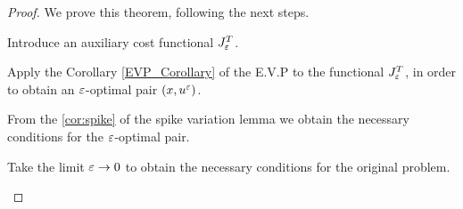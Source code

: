 \begin{proof}
    We prove this theorem, following the next steps.
    \begin{inparaenum} 
        \item
            Introduce an auxiliary cost functional $J_{\varepsilon}^{T}$.
        \item
            Apply the Corollary \eqref{EVP_Corollary} of the E.V.P to 
            the functional $J_{\varepsilon}^{T}$, in order to obtain an 
            $\varepsilon$-optimal pair $(x, u^{\varepsilon})$.
        \item
            From the \cref{cor:spike} of the spike variation lemma we obtain the necessary 
            conditions for the $\varepsilon$-optimal pair.
        \item
            Take the limit $\varepsilon \to 0$ to obtain the necessary 
            conditions for the original problem.
    \end{inparaenum}
    

\end{proof}
